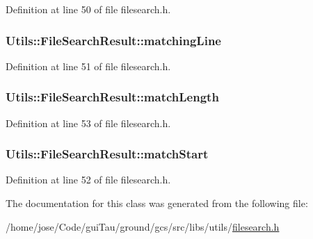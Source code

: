 Definition at line 50 of file filesearch.\-h.

\hypertarget{class_utils_1_1_file_search_result_a9fb2f9e0118742e307425f781375e572}{
\subsubsection[{matching\-Line}]{ Utils\-::\-File\-Search\-Result\-::matching\-Line}}\label{class_utils_1_1_file_search_result_a9fb2f9e0118742e307425f781375e572}


Definition at line 51 of file filesearch.\-h.

\hypertarget{class_utils_1_1_file_search_result_a57bcfdc2bdae981ab37fb9e27bb244c5}{
\subsubsection[{match\-Length}]{ Utils\-::\-File\-Search\-Result\-::match\-Length}}\label{class_utils_1_1_file_search_result_a57bcfdc2bdae981ab37fb9e27bb244c5}


Definition at line 53 of file filesearch.\-h.

\hypertarget{class_utils_1_1_file_search_result_a98b3933b899ba1a74c80c1910ff7701f}{
\subsubsection[{match\-Start}]{ Utils\-::\-File\-Search\-Result\-::match\-Start}}\label{class_utils_1_1_file_search_result_a98b3933b899ba1a74c80c1910ff7701f}


Definition at line 52 of file filesearch.\-h.



The documentation for this class was generated from the following file\-:\begin{DoxyCompactItemize}
\item 
/home/jose/\-Code/gui\-Tau/ground/gcs/src/libs/utils/\hyperlink{filesearch_8h}{filesearch.\-h}\end{DoxyCompactItemize}
